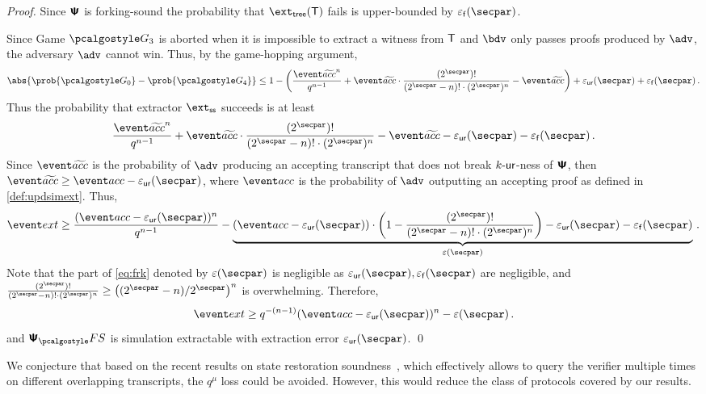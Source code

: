 \begin{proof}
		Since $\bm{\mathsf{\Psi}}$ is forking-sound the probability that $\extt(\tree)$
		fails is upper-bounded by $\epsss(\secpar)$.
		
		Since Game $\game{3}$ is aborted when it is impossible to extract a witness from
		$\mathsf{T}$ and $\bdv$ only passes proofs produced by $\adv$, the adversary $\advse$ cannot
		win. Thus, by the game-hopping argument,
		\[
		\abs{\prob{\game{0}} - \prob{\game{4}}} \leq 1 -
		\left(\frac{\waccProb^{n}}{q^{n - 1}} + \waccProb \cdot \frac{(2^\secpar)
			!}{(2^\secpar - n)! \cdot (2^\secpar)^{n}} - \waccProb\right) + \epsur(\secpar) +
		\epsss(\secpar)\,.
		\]
		Thus the probability that extractor $\extss$ succeeds is at least
		\[
		\frac{\waccProb^{n}}{q^{n - 1}} + \waccProb \cdot \frac{(2^\secpar)
			!}{(2^\secpar - n)! \cdot (2^\secpar)^{n}} - \waccProb - \epsur(\secpar) 
		- \epsss(\secpar)\,.
		\]
		Since $\waccProb$ is the probability of $\advse$ producing an accepting transcript
		that does not break ${k\text{-}\mathsf{ur}}$-ness of $\bm{\mathsf{\Psi}}$, then $\waccProb \geq \accProb -
		\epsur(\secpar)$, where $\accProb$ is the probability of $\advse$ outputting an accepting
		proof as defined in \cref{def:updsimext}. Thus, 
		\begin{equation}
		\label{eq:frk}
		\extProb \geq \frac{(\accProb - \epsur(\secpar))^{n}}{q^{n - 1}} -
		\underbrace{(\accProb - \epsur(\secpar)) \cdot \left( 1 - \frac{(2^\secpar)
				!}{(2^\secpar - n)! \cdot (2^\secpar)^{n}}\right) - \epsur(\secpar) -
			\epsss(\secpar)}_{\eps(\secpar)}\,.
		\end{equation}
		Note that the part of \cref{eq:frk} denoted by $\eps(\secpar)$ is negligible as
		$\epsur(\secpar), \epsss(\secpar)$ are negligible, and
		$\frac{(2^\secpar) !}{(2^\secpar - n)! \cdot (2^\secpar)^{n}} \geq
		\left(\infrac{(2^\secpar - n)}{2^\secpar}\right)^{n}$ is overwhelming.  Therefore,
		\[
		\extProb \geq q^{-(n - 1)} (\accProb - \epsur(\secpar))^{n} -\eps(\secpar)\,.
		\] 
		and $\psfs$ is simulation extractable with extraction error $\epsur(\secpar)$.
	\qed
\end{proof}


We conjecture that based on the recent results on state restoration
soundness~\cite{C:GhoTes21}, which effectively allows to query the verifier multiple
times on different overlapping transcripts, the $q^{\mu}$ loss could be
avoided. However, this would reduce the class of protocols covered by our results.

